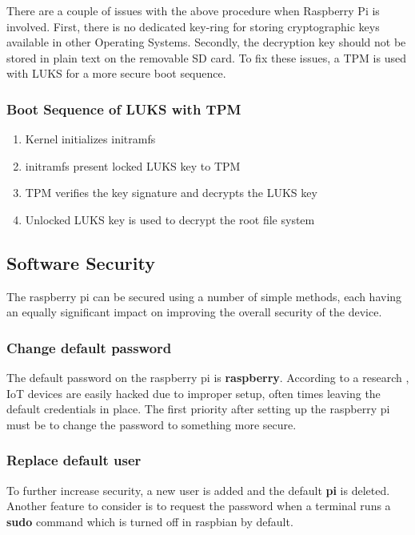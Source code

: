\documentclass[11pt,openright]{report}
\begin{document}
There are a couple of issues with the above procedure when Raspberry Pi is involved. First, there is no dedicated key-ring for storing cryptographic keys available in other Operating Systems. Secondly, the decryption key should not be stored in plain text on the removable SD card. To fix these issues, a TPM is used with LUKS for a more secure boot sequence.

\subsubsection{Boot Sequence of LUKS with TPM}
\begin{enumerate}
	\item Kernel initializes initramfs
	\item initramfs present locked LUKS key to TPM
	\item TPM verifies the key signature and decrypts the LUKS key
	\item Unlocked LUKS key is used to decrypt the root file system
\end{enumerate}



\subsection{Software Security}
The raspberry pi can be secured using a number of simple methods, each having an equally significant impact on improving the overall security of the device.

\subsubsection{Change default password}
The default password on the raspberry pi is \textbf{raspberry}. According to a research \cite{8364059}, IoT devices are easily hacked due to improper setup, often times leaving the default credentials in place. The first priority after setting up the raspberry pi must be to change the password to something more secure.

\subsubsection{Replace default user}
To further increase security, a new user is added and the default \textbf{pi} is deleted. Another feature to consider is to request the password when a terminal runs a \textbf{sudo} command which is turned off in raspbian by default.
\end{document}
